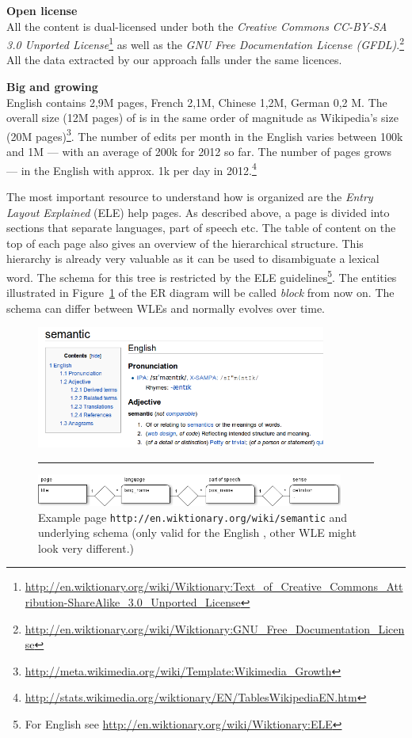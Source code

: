 \begin{compactitem}
  \item \textbf{Open license}\\
    All the content is dual-licensed under both the \textit{Creative Commons CC-BY-SA 3.0 Unported License}\footnote{\url{http://en.wiktionary.org/wiki/Wiktionary:Text_of_Creative_Commons_Attribution-ShareAlike_3.0_Unported_License}} as well as the \textit{GNU Free Documentation License (GFDL)}.\footnote{\url{http://en.wiktionary.org/wiki/Wiktionary:GNU_Free_Documentation_License}}
    All the data extracted by our approach falls under the same licences. 
  \item \textbf{Big and growing}\\
    English contains 2,9M pages, French 2,1M, Chinese 1,2M, German 0,2 M.
    The overall size (12M pages) of \wik is in the same order of magnitude as Wiki\-pedia's size (20M pages)\footnote{\url{http://meta.wikimedia.org/wiki/Template:Wikimedia_Growth}}. 
    The number of edits per month in the English \wik varies between 100k and 1M --- with an average of 200k for 2012 so far. 
    The number of pages grows --- in the English \wik with approx. 1k per day in 2012.\footnote{\url{http://stats.wikimedia.org/wiktionary/EN/TablesWikipediaEN.htm}}
\end{compactitem}
\vspace{0.5cm}
The most important resource to understand how \wik is organized are the \textit{Entry Layout Explained} (ELE) help pages.
As described above, a page is divided into sections that separate languages, part of speech etc. 
The table of content on the top of each page also gives an overview of the hierarchical structure. 
This hierarchy is already very valuable as it can be used to disambiguate a lexical word. 
The schema for this tree is restricted by the ELE guidelines\footnote{For English see \url{http://en.wiktionary.org/wiki/Wiktionary:ELE}}. 
The entities illustrated in Figure~\ref{fig:example} of the ER diagram will be called \textit{block} from now on. 
The schema can differ between WLEs and normally evolves over time.

\begin{figure}[tb]
\centering
\includegraphics[width=0.85\textwidth]{./images/example-page.png}
\vspace{0.3cm}
\rule{0.8\linewidth}{0.5pt}
\includegraphics[width=0.9\textwidth]{./images/entrylayout.png}
\caption{Example page \texttt{http://en.wiktionary.org/wiki/semantic} and underlying schema (only valid for the English \wik, other WLE might look very different.)}
\label{fig:example}
\end{figure}

